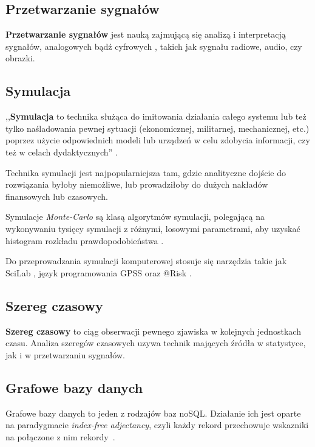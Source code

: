\documentclass[10pt,twocolumn]{llncs}          %
\begin{document}
\subsection{Przetwarzanie sygnałów}
\label{sub:przetwarzanie_sygnalow}
\textbf{Przetwarzanie sygnałów} jest nauką zajmującą się analizą i interpretacją sygnałów, analogowych bądź cyfrowych \cite{smith97}, takich jak sygnału radiowe, audio, czy obrazki.

\subsection{Symulacja}
\label{sub:symulacja}
,,\textbf{Symulacja} to technika służąca do imitowania działania całego systemu lub też tylko naśladowania pewnej sytuacji (ekonomicznej, militarnej, mechanicznej, etc.) poprzez użycie odpowiednich modeli lub urządzeń w celu zdobycia informacji, czy też w celach dydaktycznych'' \cite{www:symulacja}.

Technika symulacji jest najpopularniejsza tam, gdzie analityczne dojście do rozwiązania byłoby niemożliwe, lub prowadziłoby do dużych nakładów finansowych lub czasowych.

Symulacje \textit{Monte-Carlo} są klasą algorytmów symulacji, polegającą na wykonywaniu tysięcy symulacji z różnymi, losowymi parametrami, aby uzyskać histogram rozkładu prawdopodobieństwa \cite{math:monte-carlo}.

Do przeprowadzania symulacji komputerowej stosuje się narzędzia takie jak SciLab \cite{www:scilab}, język programowania GPSS \cite{www:gpss} oraz @Risk \cite{www:risk}.

\subsection{Szereg czasowy}
\label{sub:szereg_czasowy}
\textbf{Szereg czasowy} to ciąg obserwacji pewnego zjawiska w kolejnych jednostkach czasu. Analiza szeregów czasowych uzywa technik mających źródła w statystyce, jak i w przetwarzaniu sygnałów.

\subsection{Grafowe bazy danych}
\label{sub:grafowe_bazy_danych}
Grafowe bazy danych to jeden z rodzajów baz noSQL. Działanie ich jest oparte na paradygmacie \emph{index-free adjectancy}, czyli każdy rekord przechowuje wskazniki na połączone z nim rekordy~\cite{mizgajski13}.
\end{document}
